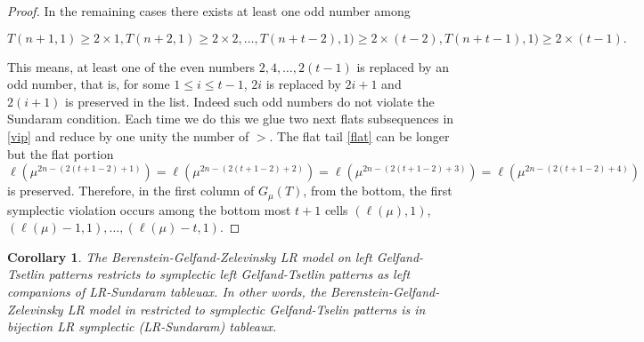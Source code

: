 \documentclass[reqno]{amsart}
\theoremstyle{tplain}
\newtheorem{cor}{Corollary}
\begin{document}
{\begin{proof}
\medskip
In the remaining  cases there exists at least one odd number among

$$T(n+1,1)\ge 2\times 1, T(n+2,1)\ge 2\times 2,\dots,
T(n+t-2),1)\ge 2\times (t-2),T(n+t-1),1)\ge 2\times (t-1).$$

This means, at least one of the even numbers $2,4,\dots, 2(t-1)$ is replaced by an odd number, that is, for some $1\le i\le t-1$, $2i$ is replaced by $2i+1$ and $2(i+1)$ is preserved in the list.
Indeed such  odd numbers do not violate the Sundaram condition. Each time we do this we glue two next flats subsequences in \eqref{vip} and reduce by one unity the number of $>$.  The  flat tail \eqref{flat} can be longer but the flat portion
$\ell(\mu^{2n-(2(t+1-2)+1)})=\ell(\mu^{2n-(2(t+1-2)+2)})=\ell(\mu^{2n-(2(t+1-2)+3)})=\ell(\mu^{2n-(2(t+1-2)+4)})$ is preserved. Therefore,  in   the first column of $G_\mu(T)$, from the bottom, the first symplectic violation   occurs among the bottom most $t+1$ cells $(\ell(\mu),1)$,  $(\ell(\mu)-1,1),\dots, (\ell(\mu)-t,1)$.

\end{proof}

\begin{cor} The Berenstein-Gelfand-Zelevinsky LR model on left Gelfand-Tsetlin patterns \cite[Theorem]{BZphy} restricts to symplectic left Gelfand-Tsetlin patterns as left companions of LR-Sundaram tableuax. In other words, the Berenstein-Gelfand-Zelevinsky LR model in \cite[Theorem 4.3]{BZphy} restricted to symplectic Gelfand-Tselin patterns is in bijection LR symplectic (LR-Sundaram) tableaux.
\end{cor}

}
\end{document}
